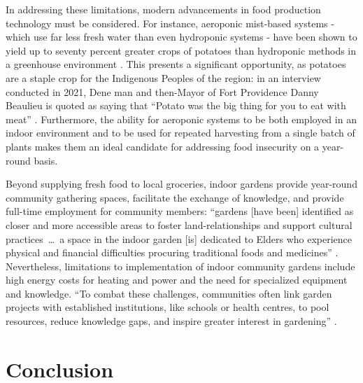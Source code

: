 \documentclass{report}
\begin{document}
\hspace{24pt} In addressing these limitations, modern advancements in food production technology must be considered. For instance, aeroponic mist-based systems - which use far less fresh water than even hydroponic systems - have been shown to yield up to seventy percent greater crops of potatoes than hydroponic methods in a greenhouse environment \parencite{aeroponicpotatoes}.
This presents a significant opportunity, as potatoes are a staple crop for the Indigenous Peoples of the region: in an interview conducted in 2021, Dene man and then-Mayor of Fort Providence Danny Beaulieu is quoted as saying that ``Potato was the big thing for you to eat with meat'' \parencite[91]{resilientcommunities}. 
Furthermore, the ability for aeroponic systems to be both employed in an indoor environment and to be used for repeated harvesting from a single batch of plants makes them an ideal candidate for addressing food insecurity on a year-round basis.

\hspace{24pt} Beyond supplying fresh food to local groceries, indoor gardens provide year-round community gathering spaces, facilitate the exchange of knowledge, and provide full-time employment for community members: ``gardens [have been] identified as closer and more accessible areas to foster land-relationships and support cultural practices~\ldots~a space in the indoor garden [is] dedicated to Elders who experience physical and financial difficulties procuring traditional foods and medicines'' \parencite[99]{resilientcommunities}. Nevertheless, limitations to implementation of indoor community gardens include high energy costs for heating and power and the need for specialized equipment and knowledge. ``To combat these challenges, communities often link garden projects with established institutions, like schools or health centres, to pool resources, reduce knowledge gaps, and inspire greater interest in gardening'' \parencite[90]{resilientcommunities}.


\section{Conclusion}
\end{document}
